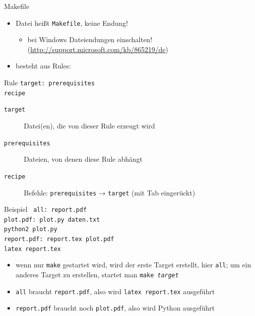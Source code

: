 \begin{frame}{Makefile}
  \begin{itemize}
    \item Datei heißt \texttt{Makefile}, keine Endung!
      \begin{itemize}
        \item bei Windows Dateiendungen einschalten! (\url{http://support.microsoft.com/kb/865219/de})
      \end{itemize}
    \item besteht aus Rules:
  \end{itemize}
  \begin{block}{Rule}
    \texttt{target: prerequisites\\
    \hspace{1cm} recipe}
  \end{block}
  \begin{description}
    \item[\texttt{target}] Datei(en), die von dieser Rule erzeugt wird
    \item[\texttt{prerequisites}] Dateien, von denen diese Rule abhängt
    \item[\texttt{recipe}] Befehle: \texttt{prerequisites} → \texttt{target} (mit Tab eingerückt)
  \end{description}
\end{frame}

\begin{frame}[shrink]{Beispiel}
  \texttt{\footnotesize
    all: report.pdf\\[0.3cm]
    plot.pdf: plot.py daten.txt\\
    \hspace{1cm} python2 plot.py\\[0.3cm]
    report.pdf: report.tex plot.pdf\\
    \hspace{1cm} latex report.tex\\[0.3cm]
  }

  \begin{itemize}
    \item wenn nur \texttt{make} gestartet wird, wird der erste Target erstellt, hier \texttt{all}; um ein anderes Target zu erstellen, startet man \texttt{make \textit{target}}
    \item \texttt{all} braucht \texttt{report.pdf}, also wird \texttt{latex report.tex} ausgeführt
    \item \texttt{report.pdf} braucht noch \texttt{plot.pdf}, also wird Python ausgeführt
  \end{itemize}
\end{frame}
